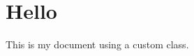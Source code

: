 \documentclass{basic}
\begin{document}
\section{Hello}
This is my document using a custom class.
\end{document}
